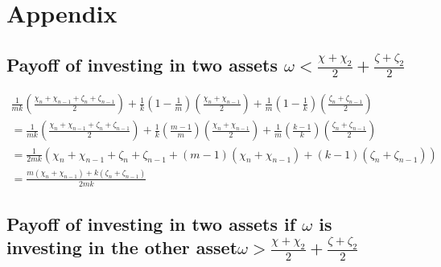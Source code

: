 \documentclass{article}
\begin{document}
\section{Appendix}
\subsection{Payoff of investing in two assets  $\omega<\frac{\chi+\chi_{2}}{2}+\frac{\zeta+\zeta_{2}}{2}$}\label{RIB}

\begin{align*}
\frac{1}{mk}\left(\frac{\chi_n+\chi_{n-1}+\zeta_n+\zeta_{n-1}}{2}\right)
+
\frac{1}{k}\left(1-\frac{1}{m}\right)\left(\frac{\chi_n+\chi_{n-1}}{2}\right)
+
\frac{1}{m}\left(1-\frac{1}{k}\right)\left(\frac{\zeta_n+\zeta_{n-1}}{2}\right) 
\\
=
\frac{1}{mk}\left(
\frac{\chi_n+\chi_{n-1}+\zeta_n+\zeta_{n-1}}{2}\right)
+
\frac{1}{k}\left(\frac{m-1}{m}\right)\left(\frac{\chi_n+\chi_{n-1}}{2}\right)
+
\frac{1}{m}\left(\frac{k-1}{k}\right)\left(\frac{\zeta_n+\zeta_{n-1}}{2}\right)
\\
=
\frac{1}{2mk}
\left(
\chi_n + \chi_{n-1}+ \zeta_n + \zeta_{n-1} 
+(m-1)
\left( \chi_n + \chi_{n-1} 
\right)
+(k-1)
\left( \zeta_n+\zeta_{n-1} 
\right)
\right) \\
=
\frac{m
\left( \chi_n + \chi_{n-1} 
\right)
+k
\left( \zeta_n+\zeta_{n-1} 
\right)}{2mk}
\end{align*}

\subsection{Payoff of investing in two assets if $\omega$ is investing in the other asset$\omega>\frac{\chi+\chi_{2}}{2}+\frac{\zeta+\zeta_{2}}{2}$}
\label{ROB}
\end{document}
